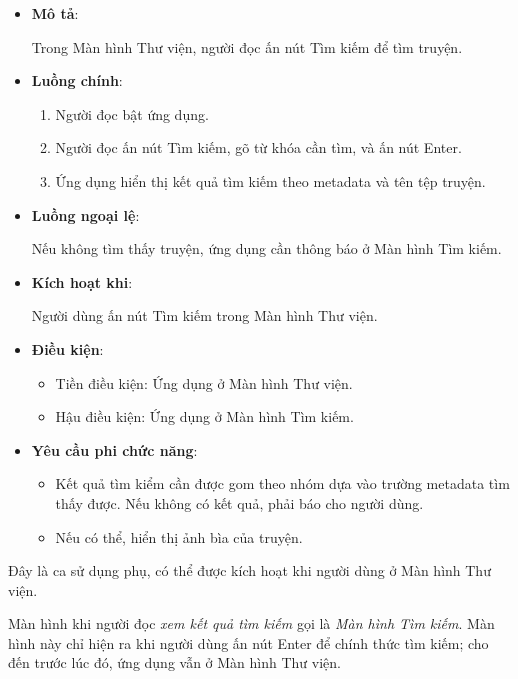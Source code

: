 \documentclass[../../thesis]{subfiles}
\begin{document}
\begin{itemize}
    \item
        \textbf{Mô tả}:

        Trong Màn hình Thư viện, người đọc ấn nút Tìm kiếm để tìm truyện.
    \item
        \textbf{Luồng chính}:

        \begin{enumerate}
            \item
                Người đọc bật ứng dụng.
            \item
                Người đọc ấn nút Tìm kiếm, gõ từ khóa cần tìm, và ấn nút Enter.
            \item
                Ứng dụng hiển thị kết quả tìm kiếm theo metadata và tên tệp
                truyện.
        \end{enumerate}
    \item
        \textbf{Luồng ngoại lệ}:

        Nếu không tìm thấy truyện, ứng dụng cần thông báo ở Màn hình Tìm kiếm.
    \item
        \textbf{Kích hoạt khi}:

        Người dùng ấn nút Tìm kiếm trong Màn hình Thư viện.
    \item
        \textbf{Điều kiện}:

        \begin{itemize}
            \item
                Tiền điều kiện: Ứng dụng ở Màn hình Thư viện.
            \item
                Hậu điều kiện: Ứng dụng ở Màn hình Tìm kiếm.
        \end{itemize}
    \item
        \textbf{Yêu cầu phi chức năng}:

        \begin{itemize}
            \item
                Kết quả tìm kiểm cần được gom theo nhóm dựa vào trường metadata
                tìm thấy được. Nếu không có kết quả, phải báo cho người dùng.
            \item
                Nếu có thể, hiển thị ảnh bìa của truyện.
        \end{itemize}
  \end{itemize}

Đây là ca sử dụng phụ, có thể được kích hoạt khi người dùng ở Màn hình Thư viện.

Màn hình khi người đọc \emph{xem kết quả tìm kiếm} gọi là \emph{Màn hình Tìm
kiếm}. Màn hình này chỉ hiện ra khi người dùng ấn nút Enter để chính thức tìm
kiếm; cho đến trước lúc đó, ứng dụng vẫn ở Màn hình Thư viện.
\end{document}
